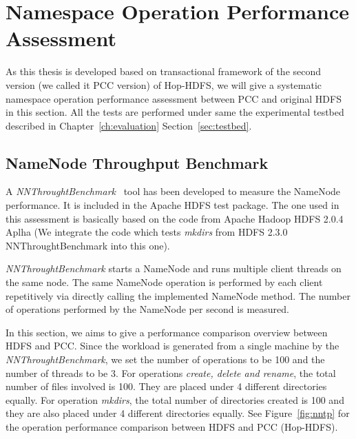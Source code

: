 
%
%
%


\chapter{Namespace Operation Performance Assessment}
\label{ch:Assessment}

 As this thesis is developed based on transactional framework of the second version (we called it PCC version) of Hop-HDFS, we will give a systematic namespace operation performance assessment between PCC and original HDFS in this section. All the tests are performed under same the experimental testbed described in Chapter~\ref{ch:evaluation} Section~\ref{sec:testbed}.

\section{NameNode Throughput Benchmark}

A \textit{NNThroughtBenchmark}~\cite{shvachko2010hdfs} tool has been developed to measure the NameNode performance. It is included in the Apache HDFS test package. The one used in this assessment is basically based on the code from Apache Hadoop HDFS 2.0.4 Aplha (We integrate the code which tests \textit{mkdirs} from HDFS 2.3.0 NNThroughtBenchmark into this one).

\noindent \textit{NNThroughtBenchmark} starts a NameNode and runs multiple client threads on the same node.  The same NameNode operation is performed by each client repetitively via directly calling the implemented NameNode method. The number of operations performed by the NameNode per second is measured.

\noindent In this section, we aims to give a performance comparison overview between HDFS and PCC. Since the workload is generated from a single machine by the \textit{NNThroughtBenchmark}, we set the number of operations to be 100 and the number of threads to be 3. For operations \textit{create, delete and rename}, the total number of files involved is 100. They are placed under 4 different directories equally. For operation \textit{mkdirs}, the total number of directories created is 100 and they are also placed under 4 different directories equally. See Figure~\ref{fig:nntp} for the operation performance comparison between HDFS and PCC (Hop-HDFS).

